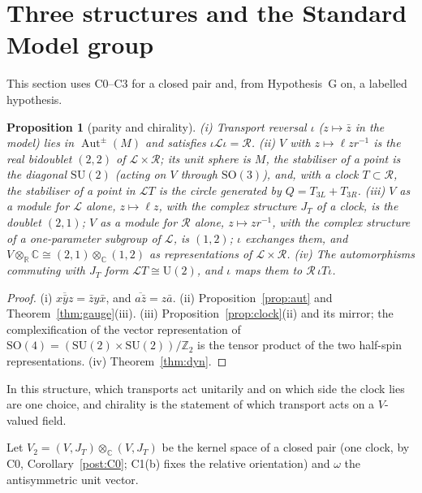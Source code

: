 \documentclass[aps,pra,onecolumn,superscriptaddress,nofootinbib,10pt]{revtex4-2}
\newtheorem{proposition}[theorem]{Proposition}
\theoremstyle{definition}
\theoremstyle{remark}
\newcommand{\R}{\mathbb{R}}
\newcommand{\C}{\mathbb{C}}
\newcommand{\Z}{\mathbb{Z}}
\newcommand{\cL}{\mathcal{L}}
\newcommand{\cR}{\mathcal{R}}
\newcommand{\Aut}{\operatorname{Aut}}
\newcommand{\SU}{\mathrm{SU}}
\newcommand{\SO}{\mathrm{SO}}
\newcommand{\U}{\mathrm{U}}
\begin{document}
\section{Three structures and the Standard Model group}\label{sec:sm}
This section uses C0--C3 for a closed pair and, from
Hypothesis~G on, a labelled hypothesis.

\begin{proposition}[parity and chirality]\label{prop:parity}
(i) Transport reversal $\iota$ ($z\mapsto\bar z$ in the model) lies in $\Aut^\pm(M)$ and satisfies
$\iota\cL\iota=\cR$.
(ii) $V$ with $z\mapsto\ell z r^{-1}$ is the real bidoublet $(2,2)$ of $\cL\times\cR$; its unit sphere is
$M$, the stabiliser of a point is the diagonal $\SU(2)$ (acting on $V$ through $\SO(3)$), and, with a
clock $T\subset\cR$, the stabiliser of a point in $\cL T$ is the circle generated by $Q=T_{3L}+T_{3R}$.
(iii) $V$ as a module for $\cL$ alone, $z\mapsto\ell z$, with the complex structure $J_T$ of a clock, is
the doublet $(2,1)$; $V$ as a module for $\cR$ alone, $z\mapsto zr^{-1}$, with the complex structure of a
one-parameter subgroup of $\cL$, is $(1,2)$; $\iota$ exchanges them, and
$V\otimes_\R\C\cong(2,1)\otimes_\C(1,2)$ as representations of $\cL\times\cR$.
(iv) The automorphisms commuting with $J_T$ form $\cL T\cong\U(2)$, and $\iota$ maps them to
$\cR\,\iota T\iota$.
\end{proposition}
\begin{proof}
(i) $\overline{x\bar yz}=\bar zy\bar x$, and $\overline{a\bar z}=z\bar a$.  (ii) Proposition~\ref{prop:aut} and
Theorem~\ref{thm:gauge}(iii).  (iii) Proposition~\ref{prop:clock}(ii) and its mirror; the complexification
of the vector representation of $\SO(4)=(\SU(2)\times\SU(2))/\Z_2$ is the tensor product of the two
half-spin representations.  (iv) Theorem~\ref{thm:dyn}.
\end{proof}
In this structure, which transports act unitarily and on which side the clock lies are one choice, and
chirality is the statement of which transport acts on a $V$-valued field.

Let $V_2=(V,J_T)\otimes_\C(V,J_T)$ be the kernel space of a closed pair (one clock, by
C0, Corollary~\ref{post:C0}; C1(b) fixes the relative orientation) and $\omega$ the antisymmetric unit vector.
\end{document}
